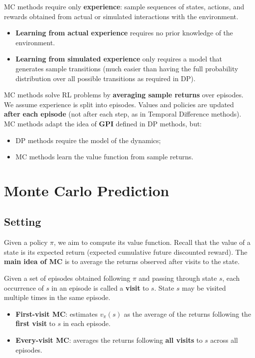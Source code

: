 \documentclass[11pt,a4paper]{article}
\theoremstyle{definition}
\theoremstyle{plain}
\theoremstyle{remark}
\begin{document}
MC methods require only \textbf{experience}: sample sequences of states, actions, and rewards obtained from actual or simulated interactions with the environment.

\begin{itemize}
    \item \textbf{Learning from actual experience} requires no prior knowledge of the environment.
    \item \textbf{Learning from simulated experience} only requires a model that generates sample transitions (much easier than having the full probability distribution over all possible transitions as required in DP).
\end{itemize}

MC methods solve RL problems by \textbf{averaging sample returns} over episodes. We assume experience is split into episodes. Values and policies are updated \textbf{after each episode} (not after each step, as in Temporal Difference methods). MC methods adapt the idea of \textbf{GPI} defined in DP methods, but:
\begin{itemize}
    \item DP methods require the model of the dynamics;
    \item MC methods learn the value function from sample returns.
\end{itemize}

\section{Monte Carlo Prediction}

\subsection{Setting}

Given a policy $\pi$, we aim to compute its value function. Recall that the value of a state is its expected return (expected cumulative future discounted reward). The \textbf{main idea of MC} is to average the returns observed after visits to the state.

Given a set of episodes obtained following $\pi$ and passing through state $s$, each occurrence of $s$ in an episode is called a \textbf{visit} to $s$. State $s$ may be visited multiple times in the same episode.

\begin{tcolorbox}[colback=blue!5!white, colframe=blue!60!black, title={First-Visit vs Every-Visit MC}]
\begin{itemize}
    \item \textbf{First-visit MC}: estimates $v_\pi(s)$ as the average of the returns following the \textbf{first visit} to $s$ in each episode.
    \item \textbf{Every-visit MC}: averages the returns following \textbf{all visits} to $s$ across all episodes.
\end{itemize}
\end{tcolorbox}
\end{document}
